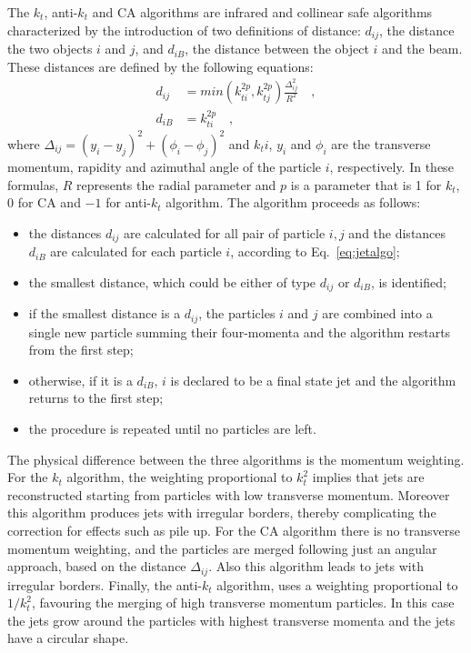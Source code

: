 The $k_t$, anti-$k_t$ and CA algorithms are infrared and collinear safe algorithms characterized by the introduction of two definitions of distance: $d_{ij}$, the distance the two objects $i$ and $j$, and $d_{iB}$, the distance between the object $i$ and the beam. These distances are defined by the following equations:
\begin{equation}\label{eq:jetalgo}
\begin{split}
d_{ij} &= min\left(k_{ti}^{2p}, k_{tj}^{2p} \right) \frac{\Delta_{ij}^2}{R^2} \quad,\\
d_{iB} &= k_{ti}^{2p} \quad,
\end{split}
\end{equation}
where $\Delta_{ij} = (y_i - y_j)^2 + (\phi_i - \phi_j)^2$ and $k_ti$, $y_i$ and $\phi_i$ are the transverse momentum, rapidity and azimuthal angle of the particle $i$, respectively. In these formulas, $R$ represents the radial parameter and $p$ is a parameter that is 1 for $k_t$, 0 for CA and $-1$ for anti-$k_t$ algorithm. The algorithm proceeds as follows:
\begin{itemize}
\item the distances $d_{ij}$ are calculated for all pair of particle $i,j$ and the distances $d_{iB}$ are calculated for each particle $i$, according to Eq.~\eqref{eq:jetalgo};
\item the smallest distance, which could be either of type $d_{ij}$ or $d_{iB}$, is identified;
\item if the smallest distance is a $d_{ij}$, the particles $i$ and $j$ are combined into a single new particle summing their four-momenta and the algorithm restarts from the first step;
\item otherwise, if it is a $d_{iB}$, $i$ is declared to be a final state jet and the algorithm returns to the first step;
\item the procedure is repeated until no particles are left.
\end{itemize}

The physical difference between the three algorithms is the momentum weighting. For the $k_t$ algorithm, the weighting proportional to $k_t^2$ implies that jets are reconstructed starting from particles with low transverse momentum. Moreover this algorithm produces jets with irregular borders, thereby complicating the correction for effects such as pile up. For the CA algorithm there is no transverse momentum weighting, and the particles are merged following just an angular approach, based on the distance $\Delta_{ij}$. Also this algorithm leads to jets with irregular borders. Finally, the anti-$k_t$ algorithm, uses a weighting proportional to $1/k_t^2$, favouring the merging of high transverse momentum particles. In this case the jets grow around the particles with highest transverse momenta and the jets have a circular shape. 


